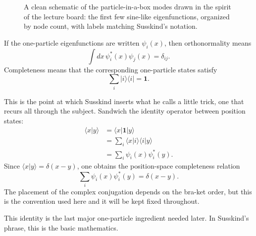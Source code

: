\begin{figure}[t]
\centering
{}
\caption{A clean schematic of the particle-in-a-box modes drawn in the spirit of the lecture board: the first few sine-like eigenfunctions, organized by node count, with labels matching Susskind's notation.}
\end{figure}

If the one-particle eigenfunctions are written $\psi_i(x)$, then orthonormality means
\begin{equation}
\int dx\,\psi_i^*(x)\psi_j(x)=\delta_{ij}.
\end{equation}
Completeness means that the corresponding one-particle states satisfy
\begin{equation}
\sum_i |i\rangle\langle i|=\mathbf{1}.
\end{equation}

This is the point at which Susskind inserts what he calls a little trick, one that recurs all through the subject. Sandwich the identity operator between position states:
\begin{align}
\langle x|y\rangle
&=\langle x|\mathbf{1}|y\rangle \\
&=\sum_i \langle x|i\rangle\langle i|y\rangle \\
&=\sum_i \psi_i(x)\psi_i^*(y).
\end{align}
Since $\langle x|y\rangle=\delta(x-y)$, one obtains the position-space completeness relation
\begin{equation}
\sum_i \psi_i(x)\psi_i^*(y)=\delta(x-y).
\end{equation}
The placement of the complex conjugation depends on the bra-ket order, but this is the convention used here and it will be kept fixed throughout.

This identity is the last major one-particle ingredient needed later. In Susskind's phrase, this is the basic mathematics.


